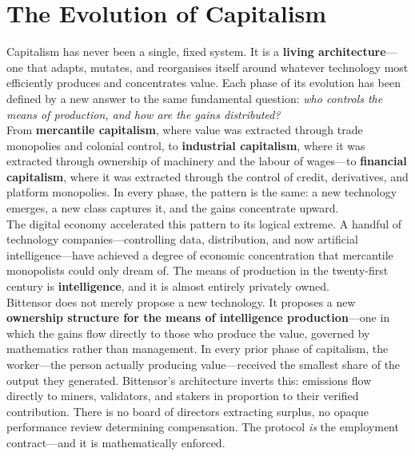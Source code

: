 \documentclass[12pt, a4paper, oneside]{report}
\theoremstyle{definition}
\begin{document}
\chapter{The Evolution of Capitalism}
\label{chap:evolution}

Capitalism has never been a single, fixed system. It is a \textbf{living 
architecture}—one that adapts, mutates, and reorganises itself around whatever 
technology most efficiently produces and concentrates value. Each phase of its 
evolution has been defined by a new answer to the same fundamental question: 
\textit{who controls the means of production, and how are the gains distributed?}\\[0.4cm]

From \textbf{mercantile capitalism}, where value was extracted through trade 
monopolies and colonial control, to \textbf{industrial capitalism}, where it 
was extracted through ownership of machinery and the labour of wages—to 
\textbf{financial capitalism}, where it was extracted through the control of 
credit, derivatives, and platform monopolies. In every phase, the pattern is 
the same: a new technology emerges, a new class captures it, and the gains 
concentrate upward.\\[0.4cm]

The digital economy accelerated this pattern to its logical extreme. A handful 
of technology companies—controlling data, distribution, and now artificial 
intelligence—have achieved a degree of economic concentration that mercantile 
monopolists could only dream of. The means of production in the twenty-first 
century is \textbf{intelligence}, and it is almost entirely privately owned.\\[0.4cm]

Bittensor does not merely propose a new technology. It proposes a new 
\textbf{ownership structure for the means of intelligence production}—one 
in which the gains flow directly to those who produce the value, governed 
by mathematics rather than management. In every prior phase of capitalism, 
the worker—the person actually producing value—received the smallest share 
of the output they generated. Bittensor's architecture inverts this: emissions 
flow directly to miners, validators, and stakers in proportion to their verified 
contribution. There is no board of directors extracting surplus, no opaque 
performance review determining compensation. The protocol \emph{is} the 
employment contract—and it is mathematically enforced.\\[0.4cm]
\end{document}
